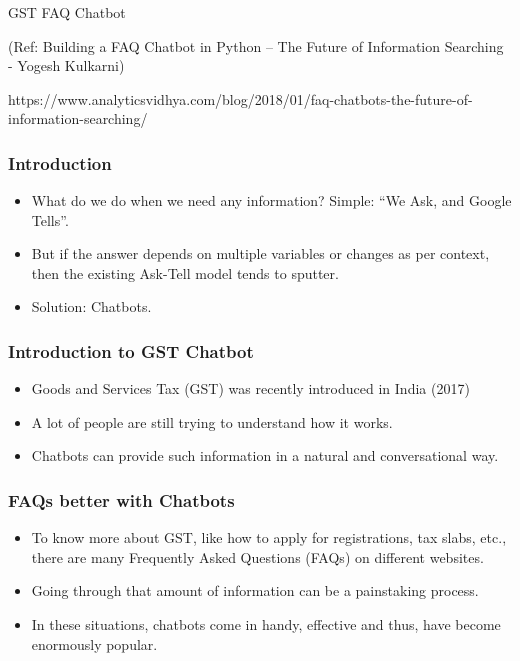 \begin{frame}[fragile]\frametitle{}
\begin{center}
{\Large GST FAQ Chatbot}


{\tiny (Ref: Building a FAQ Chatbot in Python – The Future of Information Searching - Yogesh Kulkarni)}

{\tiny https://www.analyticsvidhya.com/blog/2018/01/faq-chatbots-the-future-of-information-searching/}
\end{center}
\end{frame}

 \begin{frame}[fragile]\frametitle{Introduction}
\begin{itemize}
\item What do we do when we need any information? Simple: ``We Ask, and Google Tells''.
\item But if the answer depends on multiple variables or changes as per context, then the existing Ask-Tell model tends to sputter.
\item Solution: Chatbots.
\end{itemize}
\end{frame}


 \begin{frame}[fragile]\frametitle{Introduction to GST Chatbot}
\begin{itemize}
\item Goods and Services Tax (GST) was recently introduced in India (2017)
\item A lot of people are still trying to understand how it works. 
\item Chatbots can provide such information in a natural and conversational way.
\end{itemize}
\end{frame}

 \begin{frame}[fragile]\frametitle{FAQs better with Chatbots}
\begin{itemize}
\item To know more about GST, like how to apply for registrations, tax slabs, etc., there are many Frequently Asked Questions (FAQs) on different websites. 
\item Going through that amount of information can be a painstaking process. 
\item In these situations, chatbots come in handy, effective and thus, have become enormously popular.
\end{itemize}
\end{frame}

